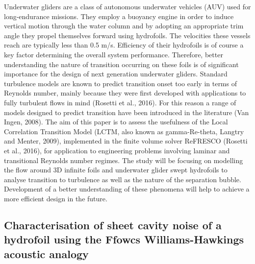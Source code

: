 \documentclass[a4paper,10pt]{article}
\begin{document}
	Underwater gliders are a class of autonomous underwater vehicles (AUV) used for long-endurance missions. They employ a buoyancy engine in order to induce vertical motion through the water column and by adopting an appropriate trim angle they propel themselves forward using hydrofoils. The velocities these vessels reach are typically less than 0.5 m/s. Efficiency of their hydrofoils is of course a key factor determining the overall system performance. Therefore, better understanding the nature of transition occurring on these foils is of significant importance for the design of next generation underwater gliders. Standard turbulence models are known to predict transition onset too early in terms of Reynolds number, mainly because they were first developed with applications to fully turbulent flows in mind (Rosetti et al., 2016). For this reason a range of models designed to predict transition have been introduced in the literature (Van Ingen, 2008). The aim of this paper is to assess the usefulness of the Local Correlation Transition Model (LCTM, also known as gamma-Re-theta, Langtry and Menter, 2009), implemented in the finite volume solver ReFRESCO (Rosetti et al., 2016), for application to engineering problems involving laminar and transitional Reynolds number regimes. The study will be focusing on modelling the flow around 3D infinite foils and underwater glider swept hydrofoils to analyse transition to turbulence as well as the nature of the separation bubble. Development of a better understanding of these phenomena will help to achieve a more efficient design in the future.

\subsection{Characterisation of sheet cavity noise of a hydrofoil using the Ffowcs Williams-Hawkings acoustic analogy \cite{Lidtke2016}}
\end{document}
